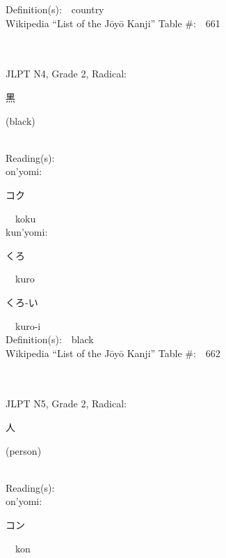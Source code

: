 \begin{multicols}{2}
Definition(s):\ \ country \\
Wikipedia ``List of the J\=oy\=o Kanji'' Table \#:\ \ 661 \\
\ \ \\
{\fontsize{34pt}{40pt}  }\ \ \\  %
{JLPT N4, Grade 2, Radical:\ \ {\begin{CJK}{UTF8}{min} 黑 \end{CJK}} (black) } \\
Reading(s):\ \ \\
{\hspace*{1em}}on'yomi:\ \ \\
{\hspace*{2em}}{\begin{CJK}{UTF8}{min} コク \end{CJK}}\ \ koku\ \ \\
{\hspace*{1em}}kun'yomi:\ \ \\
{\hspace*{2em}}{\begin{CJK}{UTF8}{min} くろ \end{CJK}}\ \ kuro\ \ \\
{\hspace*{2em}}{\begin{CJK}{UTF8}{min} くろ-い \end{CJK}}\ \ kuro-i\ \ \\
Definition(s):\ \ black \\
Wikipedia ``List of the J\=oy\=o Kanji'' Table \#:\ \ 662 \\
\ \ \\
{\fontsize{34pt}{40pt}  }\ \ \\  %
{JLPT N5, Grade 2, Radical:\ \ {\begin{CJK}{UTF8}{min} 人 \end{CJK}} (person) } \\
Reading(s):\ \ \\
{\hspace*{1em}}on'yomi:\ \ \\
{\hspace*{2em}}{\begin{CJK}{UTF8}{min} コン \end{CJK}}\ \ kon\ \ \\

\end{multicols}
